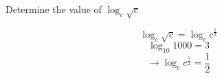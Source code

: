 \question Determine the value of $\log_{c}\sqrt{c}$
\begin{solution}
	\[
		\log_{c}{\sqrt{c}}
		=
		\log_{c}{c^{\frac{1}{2}}}
	\]
	\[
		\log_{10}{1000} = 3
	\]
	\[
		\rightarrow
		\log_{c}{c^{\frac{1}{2}}}
		= 
		\frac{1}{2}
	\]
\end{solution}

